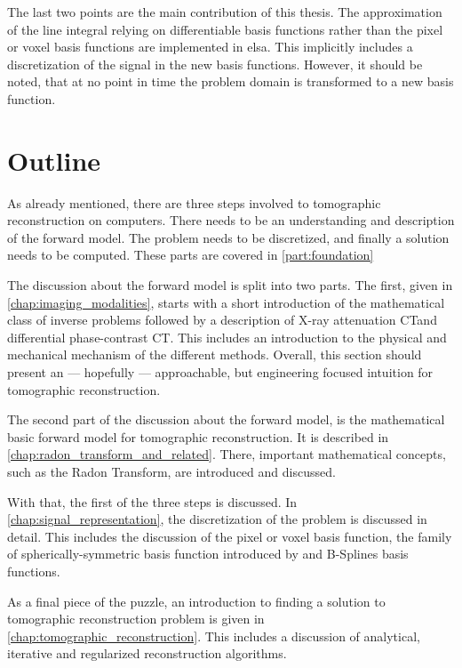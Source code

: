 The last two points are the main contribution of this thesis. The approximation of the line integral
relying on differentiable basis functions rather than the pixel or voxel basis functions are
implemented in elsa. This implicitly includes a discretization of the signal in the new basis
functions. However, it should be noted, that at no point in time the problem domain is transformed
to a new basis function.

\section{Outline}\label{sec:outline}

As already mentioned, there are three steps involved to tomographic reconstruction on computers.
There needs to be an understanding and description of the forward model. The problem needs to be
discretized, and finally a solution needs to be computed. These parts are covered in
\autoref{part:foundation}

The discussion about the forward model is split into two parts. The first, given in
\autoref{chap:imaging_modalities}, starts with a short introduction of the mathematical class of
inverse problems followed by a description of X-ray attenuation CT\@ and differential phase-contrast
CT\@. This includes an introduction to the physical and mechanical mechanism of the different
methods. Overall, this section should present an --- hopefully --- approachable, but engineering
focused intuition for tomographic reconstruction.

The second part of the discussion about the forward model, is the mathematical basic forward model
for tomographic reconstruction. It is described in \autoref{chap:radon_transform_and_related}. There,
important mathematical concepts, such as the Radon Transform, are introduced and discussed.

With that, the first of the three steps is discussed. In \autoref{chap:signal_representation}, the
discretization of the problem is discussed in detail. This includes the discussion of the pixel or
voxel basis function, the family of spherically-symmetric basis function introduced by
\citeauthor*{lewitt_multidimensional_1990} and B-Splines basis functions.

As a final piece of the puzzle, an introduction to finding a solution to tomographic reconstruction
problem is given in \autoref{chap:tomographic_reconstruction}. This includes a discussion of
analytical, iterative and regularized reconstruction algorithms.

